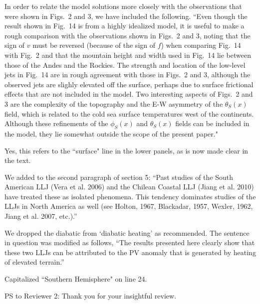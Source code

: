 \documentclass[11pt]{article}
\begin{document}
\medskip
{}  In order to relate the model solutions more closely with 
the observations that were shown in Figs.~2 and 3, we have included the following. 
``Even though the result shown in Fig.~14 is from a highly idealized model, it is 
useful to make a rough comparison with the observations shown in Figs.~2 and
3, noting that the sign of $v$ must be reversed (because of the sign of $f$) 
when comparing Fig.~14 with Fig.~2 and that the mountain height and width used 
in Fig.~14 lie between those of the Andes and the Rockies. The strength and 
location of the low-level jets in Fig.~14 are in rough agreement with those in
Figs.~2 and 3, although the observed jets are slighly elevated off the surface, 
perhaps due to surface frictional effects that are not included in the model. 
Two interesting aspects of Figs.~2 and 3 are the complexity of the topography 
and the E-W asymmetry of the $\theta_S(x)$ field, which is related to the cold
sea surface temperatures west of the continents. Although these refinements 
of the $\phi_S(x)$ and $\theta_S(x)$ fields can be included in the model, they
lie somewhat outside the scope of the present paper."  


\medskip
{}  Yes, this refers to the ``surface" line in the lower panels, 
as is now made clear in the text. 

\medskip
{}  We added to the second paragraph of section 5: ``Past studies of the South American LLJ (Vera et al. 2006) and the Chilean 
Coastal LLJ (Jiang et al. 2010) 
have treated these as isolated phenomena. This tendency dominates studies of 
the LLJs in North America as well (see Holton, 1967, Blackadar, 1957, Wexler, 1962, 
Jiang et al. 2007, etc.).''

\medskip
{}  We dropped the diabatic from `diabatic heating' as recommended.  The sentence in question 
was modified as follows, ``The results presented here clearly show that these two LLJs can be 
attributed to the PV anomaly that is generated by heating of elevated terrain.''

\medskip
{}  Capitalized ``Southern Hemisphere" on line 24. 


\bigskip
\bigskip

\noindent PS to Reviewer 2: Thank you for your insightful review.
\end{document}
